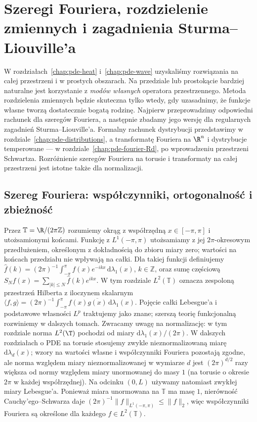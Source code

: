 \chapter[Metody Fouriera i rozdzielenie zmiennych]{Szeregi Fouriera, rozdzielenie zmiennych i zagadnienia Sturma--Liouville'a}
\label{chap:pde-fourier}

W rozdziałach~\ref{chap:pde-heat} i~\ref{chap:pde-wave} uzyskaliśmy rozwiązania na
całej przestrzeni i w prostych obszarach. Na przedziale lub prostokącie
bardziej naturalne jest korzystanie z \emph{modów własnych} operatora
przestrzennego. Metoda rozdzielenia zmiennych będzie skuteczna tylko wtedy,
gdy uzasadnimy, że funkcje własne tworzą dostatecznie bogatą rodzinę.
Najpierw przeprowadzimy odpowiedni rachunek dla szeregów Fouriera,
a następnie zbadamy jego wersję dla regularnych zagadnień
Sturma--Liouville'a. Formalny rachunek dystrybucji przedstawimy w rozdziale~\ref{chap:pde-distributions},
a transformatę Fouriera na $\R^n$ i dystrybucje temperowane ---
w rozdziale~\ref{chap:pde-fourier-Rd}, po wprowadzeniu
przestrzeni Schwartza. Rozróżnienie szeregów Fouriera na torusie
i transformaty na całej przestrzeni jest istotne także dla normalizacji.

\section{Szereg Fouriera: współczynniki, ortogonalność i zbieżność}
\label{sec:pde6-fourier}

Przez $\mathbb T=\R/(2\pi\mathbb Z)$ rozumiemy okrąg z
współrzędną $x\in[-\pi,\pi]$ i utożsamionymi końcami.
Funkcję z $L^1(-\pi,\pi)$ utożsamiamy z jej
$2\pi$-okresowym przedłużeniem, określonym z dokładnością
do zbioru miary zero; wartości na końcach przedziału
nie wpływają na całki. Dla takiej funkcji definiujemy
$\widehat f(k)=(2\pi)^{-1}\int_{-\pi}^{\pi}f(x)e^{-ikx}\,\mathrm d\lambda_1(x)$,
$k\in\mathbb Z$, oraz sumę częściową
$S_Nf(x)=\sum_{|k|\le N}\widehat f(k)e^{ikx}$.
W tym rozdziale $L^2(\mathbb T)$ oznacza zespoloną przestrzeń Hilberta
z iloczynem skalarnym
$\langle f,g\rangle=(2\pi)^{-1}\int_{-\pi}^{\pi}f(x)\overline{g(x)}\,\mathrm d\lambda_1(x)$.
Pojęcie całki Lebesgue'a i podstawowe własności $L^p$ traktujemy
jako znane; szerszą teorię funkcjonalną rozwiniemy w dalszych tomach.
Zwracamy uwagę na normalizację: w tym rozdziale norma $L^2(\T)$
pochodzi od miary $\mathrm d\lambda_1(x)/(2\pi)$.
W dalszych rozdziałach o PDE na torusie stosujemy zwykle
nieznormalizowaną miarę $\mathrm d\lambda_d(x)$; wzory
na wartości własne i współczynniki Fouriera pozostają zgodne,
ale norma względem miary nieznormalizowanej w wymiarze $d$
jest $(2\pi)^{d/2}$ razy większa od normy względem
miary unormowanej do masy $1$ (na torusie
o okresie $2\pi$ w każdej współrzędnej).
Na odcinku $(0,L)$ używamy natomiast zwykłej
miary Lebesgue'a. Ponieważ miara unormowana na
$\mathbb T$ ma masę $1$, nierówność Cauchy'ego--Schwarza
daje $(2\pi)^{-1}\|f\|_{L^1(-\pi,\pi)}\leq\|f\|_2$,
więc współczynniki Fouriera są określone dla każdego
$f\in L^2(\mathbb T)$.

